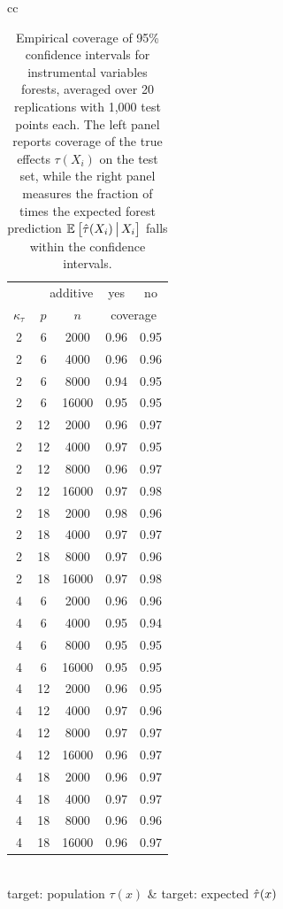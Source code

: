 \documentclass[aos]{imsart}
\theoremstyle{plain}
\theoremstyle{definition}
\theoremstyle{remark}
\begin{document}
\begin{CJK}{UTF8}{gbsn}
\begin{appendix}
\begin{table}[t]
\begin{tabular}{cc}
\begin{tabular}{|ccc|cc|}
\hline
\multicolumn{3}{|r|}{additive} & yes & no \\
$\kappa_\tau$ & $p$ & $n$ & \multicolumn{2}{c|}{coverage} \\ 
  \hline
\hline
2 & 6 & 2000 & 0.96 & 0.95 \\ 
  2 & 6 & 4000 & 0.96 & 0.96 \\ 
  2 & 6 & 8000 & 0.94 & 0.95 \\ 
  2 & 6 & 16000 & 0.95 & 0.95 \\ 
   \hline
2 & 12 & 2000 & 0.96 & 0.97 \\ 
  2 & 12 & 4000 & 0.97 & 0.95 \\ 
  2 & 12 & 8000 & 0.96 & 0.97 \\ 
  2 & 12 & 16000 & 0.97 & 0.98 \\ 
   \hline
2 & 18 & 2000 & 0.98 & 0.96 \\ 
  2 & 18 & 4000 & 0.97 & 0.97 \\ 
  2 & 18 & 8000 & 0.97 & 0.96 \\ 
  2 & 18 & 16000 & 0.97 & 0.98 \\ 
   \hline
\hline
4 & 6 & 2000 & 0.96 & 0.96 \\ 
  4 & 6 & 4000 & 0.95 & 0.94 \\ 
  4 & 6 & 8000 & 0.95 & 0.95 \\ 
  4 & 6 & 16000 & 0.95 & 0.95 \\ 
   \hline
4 & 12 & 2000 & 0.96 & 0.95 \\ 
  4 & 12 & 4000 & 0.97 & 0.96 \\ 
  4 & 12 & 8000 & 0.97 & 0.97 \\ 
  4 & 12 & 16000 & 0.96 & 0.97 \\ 
   \hline
4 & 18 & 2000 & 0.96 & 0.97 \\ 
  4 & 18 & 4000 & 0.97 & 0.97 \\ 
  4 & 18 & 8000 & 0.96 & 0.96 \\ 
  4 & 18 & 16000 & 0.96 & 0.97 \\ 
   \hline
\end{tabular} \\
target: population $\tau(x)$ & target: expected $\hat{\tau}(x)$
\end{tabular}
\caption{Empirical coverage of 95\% confidence intervals for instrumental variables forests,
averaged over 20 replications with 1,000 test points each.
The left panel reports coverage of the true effects $\tau(X_i)$ on the test set, while the right panel
measures the fraction of times the expected forest prediction $\mathbb{E}_{}\left[\hat{\tau}(X_i) \,\big|\, X_i\right]$ falls
within the confidence intervals.}
\label{tab:coverage}
\vspace{-1.5\baselineskip}
\end{table}


\end{appendix}
\end{CJK}
\end{document}
